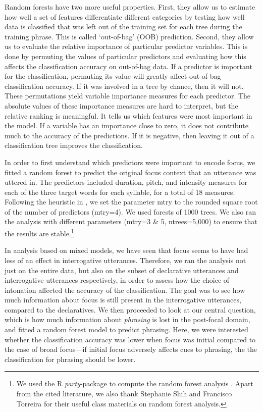 \documentclass[preprint,review,12pt,authoryear,times]{elsarticle}
\begin{document}
Random forests have two more useful properties. First, they allow us to estimate how well a set of features differentiate different categories by testing how well data is classified that was left out of the training set for each tree during the training phrase. This is called `out-of-bag' (OOB) prediction. Second, they allow us to evaluate the relative importance of particular predictor variables. This is done by permuting the values of particular predictors and evaluating how this affects the classification accuracy on out-of-bag data. If a predictor is important for the classification, permuting its value will greatly affect out-of-bag classification accuracy. If it was involved in a tree by chance, then it will not. These permutations yield variable importance measures for each predictor. The absolute values of these importance measures are hard to interpret, but the relative ranking is meaningful. It tells us which features were most important in the model. If a variable has an importance close to zero, it does not contribute much to the accuracy of the predictions. If it is negative, then leaving it out of a classification tree improves the classification. 

In order to first understand which predictors were important to encode focus, we fitted a random forest to predict the original focus context that an utterance was uttered in. The predictors included duration, pitch, and intensity measures for each of the three target words for each syllable, for a total of 18 measures.  Following the heuristic in \citet{strob09}, we set the parameter mtry to the rounded square root of the number of predictors (mtry=4). We used forests of 1000 trees. We also ran the analysis with different parameters (mtry=3 \& 5, ntrees=5,000) to ensure that the results are stable.\footnote{We used the R {\em party}-package to compute the random forest analysis \citep{hotho06,strob07,strob08}. Apart from the cited literature, we also thank Stephanie Shih and Francisco Torreira for their useful class materials on random forest analysis.}

In analysis based on mixed models, we have seen that focus seems to have had less of an effect in interrogative utterances. Therefore, we ran the analysis not just on the entire data, but also on the subset of declarative utterances and interrogative utterances respectively, in order to assess how the choice of intonation affected the accuracy of the classification. The goal was to see how much information about  focus is still present in the interrogative utterances, compared to the declaratives. We then proceeded to look at our central question, which is how much information about {\em phrasing} is lost in the post-focal domain, and fitted a random forest model to predict phrasing. Here, we were interested whether the classification accuracy was lower when focus was initial compared to the case of broad focus---if initial focus adversely affects cues to phrasing, the the classification for phrasing should be lower.
\end{document}
